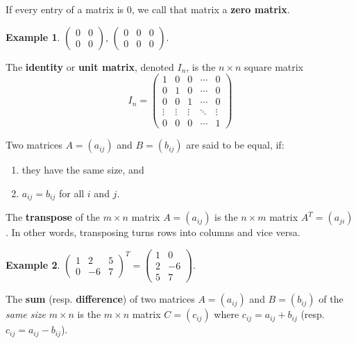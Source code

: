 \documentclass[
  english,
  12pt,
  oneside]{book}
\providecommand{\tightlist}{%
  \setlength{\itemsep}{0pt}\setlength{\parskip}{0pt}}
\theoremstyle{definition}
\theoremstyle{definition}
\newtheorem{example}{Example}[chapter]
\theoremstyle{definition}
\theoremstyle{definition}
\theoremstyle{remark}
\begin{document}
If every entry of a matrix is \(0\), we call that matrix a \textbf{zero matrix}.

\begin{example}
\protect\hypertarget{exm:unnamed-chunk-41}{}\label{exm:unnamed-chunk-41}\(\begin{pmatrix} 0 & 0\\ 0 & 0\end{pmatrix}\), \(\begin{pmatrix} 0 & 0 & 0\\ 0 & 0 & 0\end{pmatrix}\).
\end{example}

The \textbf{identity} or \textbf{unit matrix}, denoted \(I_n\), is the \(n\times n\) square matrix
\[I_n = \begin{pmatrix} 1 & 0 & 0 & \cdots & 0\\
    0 & 1 & 0 & \cdots & 0\\
    0 & 0 & 1 & \cdots & 0\\
    \vdots & \vdots & \vdots & \ddots & \vdots \\
    0 & 0 & 0 & \cdots & 1
\end{pmatrix}\]

Two matrices \(A=(a_{ij})\) and \(B=(b_{ij})\) are said to be equal, if:

\begin{enumerate}
\def\labelenumi{(\alph{enumi})}
\tightlist
\item
  they have the same size, and
\item
  \(a_{ij}=b_{ij}\) for all \(i\) and \(j\).
\end{enumerate}

The \textbf{transpose} of the \(m\times n\) matrix \(A=(a_{ij})\) is the \(n\times m\) matrix \(A^{T} = (a_{ji})\).
In other words, transposing turns rows into columns and vice versa.

\begin{example}
\protect\hypertarget{exm:unnamed-chunk-42}{}\label{exm:unnamed-chunk-42}\(\begin{pmatrix}1 & 2 & 5 \\ 0 & -6 & 7\end{pmatrix}^T = \begin{pmatrix}1&0\\2&-6\\5&7\end{pmatrix}\).
\end{example}

The \textbf{sum} (resp. \textbf{difference}) of two matrices \(A=(a_{ij})\) and \(B=(b_{ij})\) of the \emph{same size} \(m\times n\) is the \(m\times n\) matrix \(C=(c_{ij})\) where \(c_{ij}=a_{ij} + b_{ij}\) (resp. \(c_{ij}=a_{ij}-b_{ij}\)).
\end{document}
